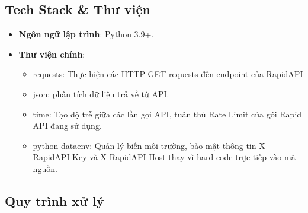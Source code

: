 \subsection{Tech Stack \& Thư viện}

\begin{itemize}
    \item \textbf{Ngôn ngữ lập trình}: Python 3.9+.
    \item \textbf{Thư viện chính}: 
    \begin{itemize}
        \item requests: Thực hiện các HTTP GET requests đến endpoint của RapidAPI
        \item json: phân tích dữ liệu trả về từ API.
        \item time: Tạo độ trễ giữa các lần gọi API, tuân thủ Rate Limit của gói Rapid API đang sử dụng.
        \item python-dataenv: Quản lý biến môi trường, bảo mật thông tin X-RapidAPI-Key và X-RapidAPI-Host thay vì hard-code trực tiếp vào mã nguồn.
    \end{itemize}
\end{itemize}

\subsection{Quy trình xử lý}

